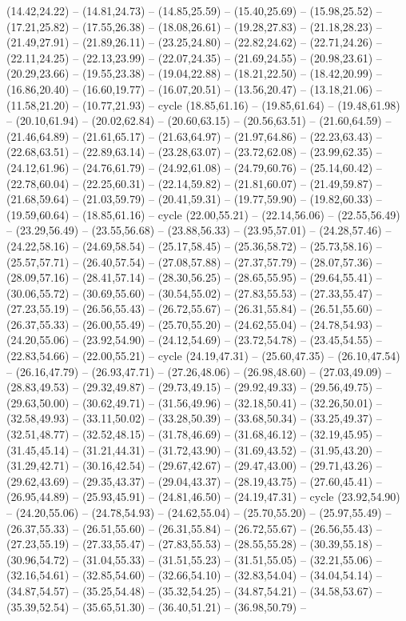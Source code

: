 {(14.42,24.22) -- (14.81,24.73) -- (14.85,25.59) -- (15.40,25.69) -- (15.98,25.52) -- (17.21,25.82) -- (17.55,26.38) -- (18.08,26.61) -- (19.28,27.83) -- (21.18,28.23) -- (21.49,27.91) -- (21.89,26.11) -- (23.25,24.80) -- (22.82,24.62) -- (22.71,24.26) -- (22.11,24.25) -- (22.13,23.99) -- (22.07,24.35) -- (21.69,24.55) -- (20.98,23.61) -- (20.29,23.66) -- (19.55,23.38) -- (19.04,22.88) -- (18.21,22.50) -- (18.42,20.99) -- (16.86,20.40) -- (16.60,19.77) -- (16.07,20.51) -- (13.56,20.47) -- (13.18,21.06) -- (11.58,21.20) -- (10.77,21.93) -- cycle (18.85,61.16) -- (19.85,61.64) -- (19.48,61.98) -- (20.10,61.94) -- (20.02,62.84) -- (20.60,63.15) -- (20.56,63.51) -- (21.60,64.59) -- (21.46,64.89) -- (21.61,65.17) -- (21.63,64.97) -- (21.97,64.86) -- (22.23,63.43) -- (22.68,63.51) -- (22.89,63.14) -- (23.28,63.07) -- (23.72,62.08) -- (23.99,62.35) -- (24.12,61.96) -- (24.76,61.79) -- (24.92,61.08) -- (24.79,60.76) -- (25.14,60.42) -- (22.78,60.04) -- (22.25,60.31) -- (22.14,59.82) -- (21.81,60.07) -- (21.49,59.87) -- (21.68,59.64) -- (21.03,59.79) -- (20.41,59.31) -- (19.77,59.90) -- (19.82,60.33) -- (19.59,60.64) -- (18.85,61.16) -- cycle (22.00,55.21) -- (22.14,56.06) -- (22.55,56.49) -- (23.29,56.49) -- (23.55,56.68) -- (23.88,56.33) -- (23.95,57.01) -- (24.28,57.46) -- (24.22,58.16) -- (24.69,58.54) -- (25.17,58.45) -- (25.36,58.72) -- (25.73,58.16) -- (25.57,57.71) -- (26.40,57.54) -- (27.08,57.88) -- (27.37,57.79) -- (28.07,57.36) -- (28.09,57.16) -- (28.41,57.14) -- (28.30,56.25) -- (28.65,55.95) -- (29.64,55.41) -- (30.06,55.72) -- (30.69,55.60) -- (30.54,55.02) -- (27.83,55.53) -- (27.33,55.47) -- (27.23,55.19) -- (26.56,55.43) -- (26.72,55.67) -- (26.31,55.84) -- (26.51,55.60) -- (26.37,55.33) -- (26.00,55.49) -- (25.70,55.20) -- (24.62,55.04) -- (24.78,54.93) -- (24.20,55.06) -- (23.92,54.90) -- (24.12,54.69) -- (23.72,54.78) -- (23.45,54.55) -- (22.83,54.66) -- (22.00,55.21) -- cycle (24.19,47.31) -- (25.60,47.35) -- (26.10,47.54) -- (26.16,47.79) -- (26.93,47.71) -- (27.26,48.06) -- (26.98,48.60) -- (27.03,49.09) -- (28.83,49.53) -- (29.32,49.87) -- (29.73,49.15) -- (29.92,49.33) -- (29.56,49.75) -- (29.63,50.00) -- (30.62,49.71) -- (31.56,49.96) -- (32.18,50.41) -- (32.26,50.01) -- (32.58,49.93) -- (33.11,50.02) -- (33.28,50.39) -- (33.68,50.34) -- (33.25,49.37) -- (32.51,48.77) -- (32.52,48.15) -- (31.78,46.69) -- (31.68,46.12) -- (32.19,45.95) -- (31.45,45.14) -- (31.21,44.31) -- (31.72,43.90) -- (31.69,43.52) -- (31.95,43.20) -- (31.29,42.71) -- (30.16,42.54) -- (29.67,42.67) -- (29.47,43.00) -- (29.71,43.26) -- (29.62,43.69) -- (29.35,43.37) -- (29.04,43.37) -- (28.19,43.75) -- (27.60,45.41) -- (26.95,44.89) -- (25.93,45.91) -- (24.81,46.50) -- (24.19,47.31) -- cycle (23.92,54.90) -- (24.20,55.06) -- (24.78,54.93) -- (24.62,55.04) -- (25.70,55.20) -- (25.97,55.49) -- (26.37,55.33) -- (26.51,55.60) -- (26.31,55.84) -- (26.72,55.67) -- (26.56,55.43) -- (27.23,55.19) -- (27.33,55.47) -- (27.83,55.53) -- (28.55,55.28) -- (30.39,55.18) -- (30.96,54.72) -- (31.04,55.33) -- (31.51,55.23) -- (31.51,55.05) -- (32.21,55.06) -- (32.16,54.61) -- (32.85,54.60) -- (32.66,54.10) -- (32.83,54.04) -- (34.04,54.14) -- (34.87,54.57) -- (35.25,54.48) -- (35.32,54.25) -- (34.87,54.21) -- (34.58,53.67) -- (35.39,52.54) -- (35.65,51.30) -- (36.40,51.21) -- (36.98,50.79) -- }
